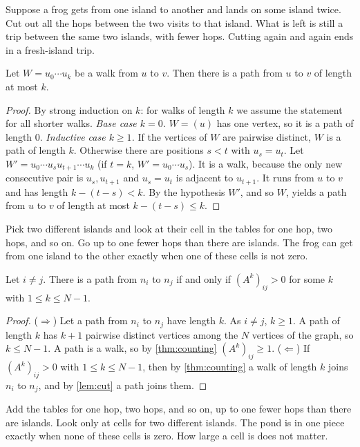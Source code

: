\plainwords{} Suppose a frog gets from one island to another and lands on some island twice. Cut out all the hops between the two visits to that island. What is left is still a trip between the same two islands, with fewer hops. Cutting again and again ends in a fresh-island trip.

\begin{lemma}\label{lem:cut}
Let $W=u_0\cdots u_k$ be a walk from $u$ to $v$. Then there is a path from $u$
to $v$ of length at most $k$.
\end{lemma}
\begin{proof}
By strong induction on $k$: for walks of length $k$ we assume the statement
for all shorter walks. \emph{Base case $k=0$.} $W=(u)$ has one vertex, so it
is a path of length $0$. \emph{Inductive case $k\ge 1$.} If the vertices of $W$
are pairwise distinct, $W$ is a path of length $k$. Otherwise there are
positions $s<t$ with $u_s=u_t$. Let $W'=u_0\cdots u_su_{t+1}\cdots u_k$
(if $t=k$, $W'=u_0\cdots u_s$). It is a walk, because the only new
consecutive pair is $u_s,u_{t+1}$ and $u_s=u_t$ is adjacent to $u_{t+1}$. It
runs from $u$ to $v$ and has length $k-(t-s)<k$. By the hypothesis $W'$, and so
$W$, yields a path from $u$ to $v$ of length at most $k-(t-s)\le k$.
\end{proof}

\plainwords{} Pick two different islands and look at their cell in the tables for one hop, two hops, and so on. Go up to one fewer hops than there are islands. The frog can get from one island to the other exactly when one of these cells is not zero.

\begin{lemma}\label{lem:reach}
Let $i\ne j$. There is a path from $n_i$ to $n_j$ if and only if
$(A^k)_{ij}>0$ for some $k$ with $1\le k\le N-1$.
\end{lemma}
\begin{proof}
($\Rightarrow$) Let a path from $n_i$ to $n_j$ have length $k$. As $i\ne j$,
$k\ge 1$. A path of length $k$ has $k+1$ pairwise distinct vertices among
the $N$ vertices of the graph, so $k\le N-1$. A path is a walk, so by
\cref{thm:counting} $(A^k)_{ij}\ge 1$. ($\Leftarrow$) If $(A^k)_{ij}>0$ with
$1\le k\le N-1$, then by \cref{thm:counting} a walk of length $k$ joins $n_i$
to $n_j$, and by \cref{lem:cut} a path joins them.
\end{proof}

\plainwords{} Add the tables for one hop, two hops, and so on, up to one fewer hops than there are islands. Look only at cells for two different islands. The pond is in one piece exactly when none of these cells is zero. How large a cell is does not matter.

